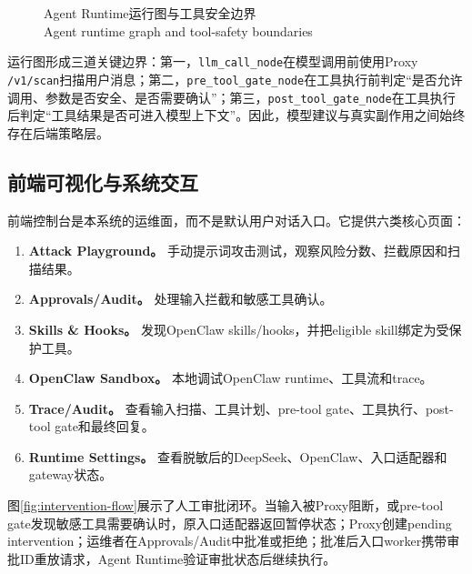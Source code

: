 \documentclass[UTF8,zihao=-4,scheme=chinese,fontset=none]{ctexart}
\newcommand{\code}[1]{{\ttfamily\small\nolinkurl{#1}}}
\newcommand{\bicaption}[2]{\caption{#1\\\small #2}}
\begin{document}
\begin{figure}[tbp]
  \bicaption{Agent Runtime运行图与工具安全边界}{Agent runtime graph and tool-safety boundaries}
  \label{fig:agent-pipeline}
\end{figure}

运行图形成三道关键边界：第一，\code{llm_call_node}在模型调用前使用Proxy \code{/v1/scan}扫描用户消息；第二，\code{pre_tool_gate_node}在工具执行前判定“是否允许调用、参数是否安全、是否需要确认”；第三，\code{post_tool_gate_node}在工具执行后判定“工具结果是否可进入模型上下文”。因此，模型建议与真实副作用之间始终存在后端策略层。

\subsection{前端可视化与系统交互}

前端控制台是本系统的运维面，而不是默认用户对话入口。它提供六类核心页面：

\begin{enumerate}[label=（\arabic*）]
  \item \textbf{Attack Playground。} 手动提示词攻击测试，观察风险分数、拦截原因和扫描结果。
  \item \textbf{Approvals/Audit。} 处理输入拦截和敏感工具确认。
  \item \textbf{Skills \& Hooks。} 发现OpenClaw skills/hooks，并把eligible skill绑定为受保护工具。
  \item \textbf{OpenClaw Sandbox。} 本地调试OpenClaw runtime、工具流和trace。
  \item \textbf{Trace/Audit。} 查看输入扫描、工具计划、pre-tool gate、工具执行、post-tool gate和最终回复。
  \item \textbf{Runtime Settings。} 查看脱敏后的DeepSeek、OpenClaw、入口适配器和gateway状态。
\end{enumerate}

图\ref{fig:intervention-flow}展示了人工审批闭环。当输入被Proxy阻断，或pre-tool gate发现敏感工具需要确认时，原入口适配器返回暂停状态；Proxy创建pending intervention；运维者在Approvals/Audit中批准或拒绝；批准后入口worker携带审批ID重放请求，Agent Runtime验证审批状态后继续执行。
\end{document}
